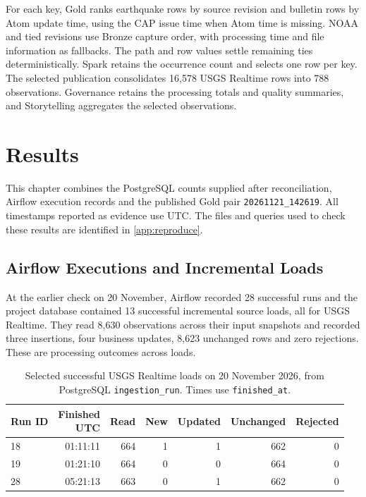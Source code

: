 \documentclass[a4paper,11pt,oneside]{book}
\newcommand{\goldstamp}{\texttt{20261121\_142619}}
\begin{document}
For each  key, Gold ranks earthquake rows by source revision and bulletin rows by Atom update time, using the CAP issue time when Atom time is missing. NOAA and tied revisions use Bronze capture order, with processing time and file information as fallbacks. The path and row values settle remaining ties deterministically. Spark retains the occurrence count and selects one row per key. The selected publication consolidates 16,578 USGS Realtime rows into 788 observations. Governance retains the processing totals and quality summaries, and Storytelling aggregates the selected observations.

\chapter{Results}
\label{ch:results}
This chapter combines the PostgreSQL counts supplied after reconciliation, Airflow execution records and the published Gold pair \goldstamp. All timestamps reported as evidence use UTC. The files and queries used to check these results are identified in \cref{app:reproduce}.

\section{Airflow Executions and Incremental Loads}
\label{sec:airflow-results}
At the earlier check on 20 November, Airflow recorded 28 successful  runs and the project database contained 13 successful incremental source loads, all for USGS Realtime. They read 8,630 observations across their input snapshots and recorded three insertions, four business updates, 8,623 unchanged rows and zero rejections. These are processing outcomes across loads.

\begin{table}[htbp]
\centering
\small
\begin{tabular}{@{}lrrrrrr@{}}
\toprule
Run ID & \makecell{Finished\\UTC} & Read & New & Updated & Unchanged & Rejected \\
\midrule
18 & 01:11:11 & 664 & 1 & 1 & 662 & 0 \\
19 & 01:21:10 & 664 & 0 & 0 & 664 & 0 \\
28 & 05:21:13 & 663 & 0 & 1 & 662 & 0 \\
\bottomrule
\end{tabular}
\caption[Selected successful USGS Realtime loads]{Selected successful USGS Realtime loads on 20 November 2026, from PostgreSQL \texttt{ingestion\_run}. Times use \texttt{finished\_at}.}
\label{tab:incremental-runs}
\end{table}
\end{document}

